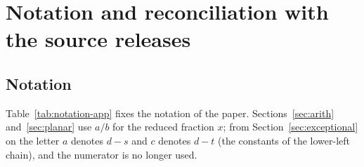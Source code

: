 
\section{Notation and reconciliation with the source releases}\label{app:notation}

\subsection{Notation}

Table~\ref{tab:notation-app} fixes the notation of the paper. Sections~\ref{sec:arith} and~\ref{sec:planar} use $a/b$ for the reduced fraction $x$; from Section~\ref{sec:exceptional} on the letter $a$ denotes $d-s$ and $c$ denotes $d-t$ (the constants of the lower-left chain), and the numerator is no longer used.

